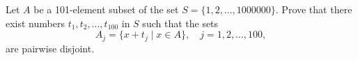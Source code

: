 Let $A$ be a 101-element subset of the set $S = \{1, 2, \ldots, 1000000\}$. Prove that there exist numbers $t_1, t_2, \ldots, t_{100}$ in $S$ such that the sets
\[ A_j = \{x + t_j \mid x \in A\}, \quad j = 1, 2, \ldots, 100, \]
are pairwise disjoint.
